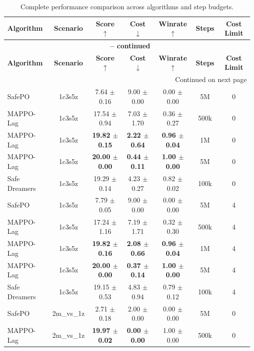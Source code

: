 \begin{longtable}{lcccccc}
\caption{Complete performance comparison across algorithms and step budgets.}
\label{tab:complete_performance_comparison_100k} \\
\toprule
\textbf{Algorithm} & \textbf{Scenario} & \textbf{Score} $\uparrow$ & \textbf{Cost} $\downarrow$ & \textbf{Winrate} $\uparrow$ & \textbf{Steps} & \textbf{Cost Limit} \\
\midrule
\endfirsthead
\multicolumn{7}{c}{{\bfseries \tablename\ \thetable{} -- continued}} \\
\toprule
\textbf{Algorithm} & \textbf{Scenario} & \textbf{Score} $\uparrow$ & \textbf{Cost} $\downarrow$ & \textbf{Winrate} $\uparrow$ & \textbf{Steps} & \textbf{Cost Limit} \\
\midrule
\endhead
\midrule \multicolumn{7}{r}{{Continued on next page}} \\
\endfoot
\bottomrule
\endlastfoot
SafePO & 1c3s5z & 7.64 $\pm$ 0.16 & 9.00 $\pm$ 0.00 & 0.00 $\pm$ 0.00 & 5M & 0 \\
MAPPO-Lag & 1c3s5z & 17.54 $\pm$ 0.94 & 7.03 $\pm$ 1.70 & 0.36 $\pm$ 0.27 & 500k & 0 \\
MAPPO-Lag & 1c3s5z & \textbf{19.82 $\pm$ 0.15} & \textbf{2.22 $\pm$ 0.64} & \textbf{0.96 $\pm$ 0.04} & 1M & 0 \\
MAPPO-Lag & 1c3s5z & \textbf{20.00 $\pm$ 0.00} & \textbf{0.44 $\pm$ 0.11} & \textbf{1.00 $\pm$ 0.00} & 5M & 0 \\
Safe Dreamers & 1c3s5z & 19.29 $\pm$ 0.14 & 4.23 $\pm$ 0.27 & 0.82 $\pm$ 0.02 & 100k & 0 \\
\midrule
SafePO & 1c3s5z & 7.79 $\pm$ 0.05 & 9.00 $\pm$ 0.00 & 0.00 $\pm$ 0.00 & 5M & 4 \\
MAPPO-Lag & 1c3s5z & 17.24 $\pm$ 1.16 & 7.19 $\pm$ 1.71 & 0.32 $\pm$ 0.30 & 500k & 4 \\
MAPPO-Lag & 1c3s5z & \textbf{19.82 $\pm$ 0.16} & \textbf{2.08 $\pm$ 0.66} & \textbf{0.96 $\pm$ 0.04} & 1M & 4 \\
MAPPO-Lag & 1c3s5z & \textbf{20.00 $\pm$ 0.00} & \textbf{0.37 $\pm$ 0.14} & \textbf{1.00 $\pm$ 0.00} & 5M & 4 \\
Safe Dreamers & 1c3s5z & 19.15 $\pm$ 0.53 & 4.83 $\pm$ 0.94 & 0.79 $\pm$ 0.12 & 100k & 4 \\
\midrule
SafePO & 2m\_vs\_1z & 2.71 $\pm$ 0.18 & 2.00 $\pm$ 0.00 & 0.00 $\pm$ 0.00 & 5M & 0 \\
MAPPO-Lag & 2m\_vs\_1z & \textbf{19.97 $\pm$ 0.02} & \textbf{0.00 $\pm$ 0.00} & 1.00 $\pm$ 0.00 & 500k & 0 \\

\end{longtable}
